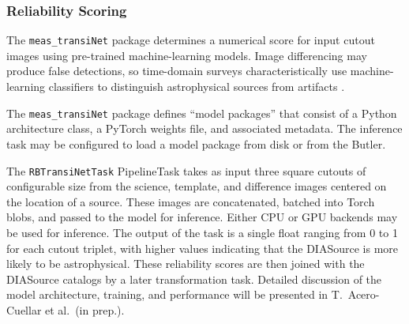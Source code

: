 \subsubsection{Reliability Scoring}
\label{sec:reliability}

The \texttt{meas\_transiNet} package determines a numerical score for input cutout images using pre-trained machine-learning models.
Image differencing may produce false detections, so time-domain surveys characteristically use machine-learning classifiers to distinguish astrophysical sources from artifacts \citep[``Real/Bogus;'' e.g.,][]{2012PASP..124.1175B, 2015AJ....150...82G, 2019MNRAS.489.3582D}.

The \texttt{meas\_transiNet} package defines ``model packages'' that consist of a Python architecture class, a PyTorch \citep{NEURIPS2019_bdbca288} weights file, and associated metadata.
The inference task may be configured to load a model package from disk or from the Butler.

The \texttt{RBTransiNetTask} PipelineTask takes as input three square cutouts of configurable size from the science, template, and difference images centered on the location of a source.
These images are concatenated, batched into Torch blobs, and passed to the model for inference.
Either CPU or GPU backends may be used for inference.
The output of the task is a single float ranging from 0 to 1 for each cutout triplet, with higher values indicating that the DIASource is more likely to be astrophysical.
These reliability scores are then joined with the DIASource catalogs by a later transformation task.
Detailed discussion of the model architecture, training, and performance will be presented in T.\ Acero-Cuellar et al.\ (in prep.).
